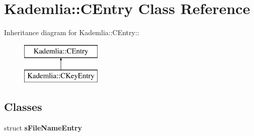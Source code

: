 \section{Kademlia::CEntry Class Reference}
\label{classKademlia_1_1CEntry}
Inheritance diagram for Kademlia::CEntry::\begin{figure}[H]
\begin{center}
\leavevmode
\includegraphics[height=2cm]{classKademlia_1_1CEntry}
\end{center}
\end{figure}
\subsection*{Classes}
\begin{DoxyCompactItemize}
\item 
struct {\bf sFileNameEntry}
\end{DoxyCompactItemize}
